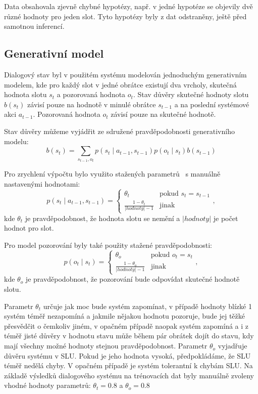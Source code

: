 Data obsahovala zjevně chybné hypotézy, např. v jedné hypotéze se objevily dvě různé hodnoty pro jeden slot.
Tyto hypotézy byly z dat odstraněny, ještě před samotnou inferencí.

\subsection{Generativní model}

Dialogový stav byl v použitém systému modelován jednoduchým generativním modelem, kde pro každý slot v jedné obrátce existují dva vrcholy, skutečná hodnota slotu $s_t$ a pozorovaná hodnota $o_t$.
Stav důvěry skutečné hodnoty slotu $b(s_t)$ závisí pouze na hodnotě v minulé obrátce $s_{t-1}$ a na poslední systémové akci $a_{t-1}$.
Pozorovaná hodnota $o_t$ závisí pouze na skutečné hodnotě.

Stav důvěry můžeme vyjádřit ze sdružené pravděpodobnosti generativního modelu:
\begin{equation}
b(s_t) = \sum_{s_{t-1}, o_t} p(s_t \mid a_{t-1}, s_{t-1}) p(o_t \mid s_t) b(s_{t-1})
\end{equation}

Pro zrychlení výpočtu bylo využito stažených parametrů~\cite{thomson2010bayesian} s manuálně nastavenými hodnotami:
\begin{equation}
p(s_t \mid a_{t-1}, s_{t-1}) = \begin{cases}
\theta_t & \text{pokud } s_t = s_{t-1} \\
\frac{1 - \theta_t}{|hodnoty| - 1} & \text{jinak}
\end{cases},
\end{equation}
kde $\theta_t$ je pravděpodobnost, že hodnota slotu se nemění a $|hodnoty|$ je počet hodnot pro slot.

Pro model pozorování byly také použity stažené pravděpodobnosti:
\begin{equation}
p(o_t \mid s_t) = \begin{cases}
\theta_o & \text{pokud } o_t = s_t \\
\frac{1 - \theta_o}{|hodnoty| - 1} & \text{jinak}
\end{cases},
\end{equation}
kde $\theta_o$ je pravděpodobnost, že pozorování bude odpovídat skutečné hodnotě slotu.

Parametr $\theta_t$ určuje jak moc bude systém zapomínat, v případě hodnoty blízké 1 systém téměř nezapomíná a jakmile nějakou hodnotu pozoruje, bude jej těžké přesvědčit o čemkoliv jiném, v opačném případě naopak systém zapomíná a i z téměř jisté důvěry v hodnotu stavu může během pár obrátek dojít do stavu, kdy mají všechny možné hodnoty stejnou pravděpodobnost.
Parametr $\theta_o$ vyjadřuje důvěru systému v SLU.
Pokud je jeho hodnota vysoká, předpokládáme, že SLU téměř nedělá chyby.
V opačném případě je systém tolerantní k chybám SLU.
Na základě výsledků dialogového systému na trénovacích dat byly manuálně zvoleny vhodné hodnoty parametrů: $\theta_t = 0.8$ a $\theta_o = 0.8$

